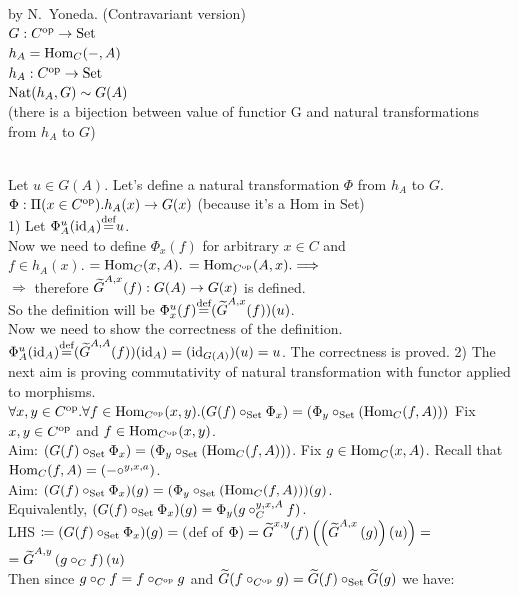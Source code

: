 \documentclass[10pt,a4paper]{article}
\begin{document}
\myqed
\begin{lemma}{by N.~Yoneda. (Contravariant version)}\\
$G : C^{\textrm{op}} \to {\textrm{Set}}$\\
$h_A = {\textrm{Hom}}_C(-,A)$\\
$h_A : C^{\textrm{op}} \to {\textrm{Set}}$\\
${\textrm{Nat}}(h_A,G)\sim G(A)$\\
(there is a bijection between value of functior G and natural transformations from $h_A$ to $G$)
\end{lemma}
\myprf\\
Let $u\in G(A)$. Let's define a natural transformation $\Phi$ from $h_A$ to $G$.\\
$\Phi:\Pi(x\in C^{\textrm{op}}).h_A(x)\to G(x)$ (because it's a Hom in Set)\\
1) Let $\Phi^u_A({\textrm{id}}_A){\stackrel{{\textrm{def}}}{=}} u$. \\
Now we need to define $\Phi_x(f)$ for arbitrary $x\in C$ and\\
$f\in h_A(x).$ $={\textrm{Hom}}_C(x,A).$ $={\textrm{Hom}}_{C^{\textrm{op}}}(A,x). \Longrightarrow$\\
$\Longrightarrow$ therefore ${\widetilde{G}\textrm{}} ^{A,x}(f):G(A)\to G(x)$ is defined.\\
So the definition will be $\Phi^u_x(f){\stackrel{{\textrm{def}}}{=}} ({\widetilde{G}\textrm{}}^{A,x}(f))(u)$.\\
Now we need to show the correctness of the definition.\\
$\Phi^u_A({\textrm{id}}_A){\stackrel{{\textrm{def}}}{=}} ({\widetilde{G}\textrm{}}^{A,A}(f))({\textrm{id}}_A) = ({\textrm{id}}_{G(A)})(u) = u$. The correctness is proved.
2) The next aim is proving commutativity of natural transformation with functor applied to morphisms.\\
$\forall x,y\in C^{\textrm{op}}.\forall f\in {\textrm{Hom}}_{C^{\textrm{op}}}(x,y).(G(f)\circ_{\textrm{Set}} \Phi_x) = (\Phi_y \circ_{\textrm{Set}} ({\textrm{Hom}}_C(f,A)))$
Fix  $x,y\in C^{\textrm{op}}$ and $f\in {\textrm{Hom}}_{C^{\textrm{op}}}(x,y)$.\\
Aim: $(G(f)\circ_{\textrm{Set}} \Phi_x) = (\Phi_y \circ_{\textrm{Set}} ({\textrm{Hom}}_C(f,A)))$.
Fix $g\in {\textrm{Hom}}_C(x,A)$. Recall that ${\textrm{Hom}}_C(f,A)=(-\circ^{y,x,a})$.\\
Aim: $(G(f)\circ_{\textrm{Set}} \Phi_x)(g) = (\Phi_y \circ_{\textrm{Set}} ({\textrm{Hom}}_C(f,A)))(g)$.\\
Equivalently, $(G(f)\circ_{\textrm{Set}} \Phi_x)(g) = \Phi_y (g\circ_C^{y,x,A} f)$.\\
LHS $\coloneqq (G(f)\circ_{\textrm{Set}} \Phi_x)(g) =($def of $\Phi)= {\widetilde{G}\textrm{}}^{x,y}(f)\left(\left({\widetilde{G}\textrm{}}^{A,x}\left(g\right)\right)\left(u\right)\right) =$\\
$ ={\widetilde{G}\textrm{}}^{A,y}\left(g\circ_C f\right)(u)$\\
Then since $g\circ_C f = f\circ_{C^{\textrm{op}}} g$ and ${\widetilde{G}\textrm{}}(f\circ_{C^{\textrm{op}}} g)=  {\widetilde{G}\textrm{}}(f)\circ_{\textrm{Set}} {\widetilde{G}\textrm{}}(g)$ we have:\\
\end{document}
